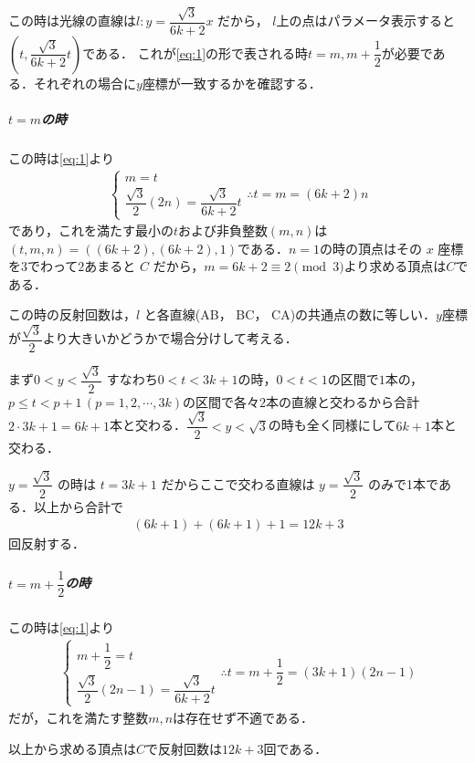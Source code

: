 \documentclass[../../main.tex]{subfiles}
\begin{document}
この時は光線の直線は$l : y = \dfrac{\sqrt{3}}{6k+2}x$ だから，
$l$上の点はパラメータ表示すると$\left(t, \dfrac{\sqrt{3}}{6k+2}t\right)$である．
これが\cref{eq:1}の形で表される時$t=m, m+\dfrac{1}{2}$が必要である．それぞれの場合に$y$座標が一致するかを確認する．

\subparagraph{$t=m$の時}

この時は\cref{eq:1}より
\begin{align}
  \begin{cases}
    m = t \\
    \dfrac{\sqrt{3}}{2}(2n) = \dfrac{\sqrt{3}}{6k+2}t
  \end{cases}
  \therefore
  t = m = (6k+2)n
\end{align}
であり，これを満たす最小の$t$および非負整数$(m,n)$は$(t,m,n)=((6k+2),(6k+2),1)$である．$n=1$の時の頂点はその $x$ 座標を3でわって$2$あまると $C$ だから，$m=6k+2\equiv 2 \pmod 3$より求める頂点は$C$である．


この時の反射回数は，$l$ と各直線(AB， BC， CA)の共通点の数に等しい．$y$座標が$\dfrac{\sqrt{3}}{2}$より大きいかどうかで場合分けして考える．

まず$0 < y < \dfrac{\sqrt{3}}{2}$ すなわち$0<t<3k+1$の時，$0<t<1$の区間で$1$本の，$p\le t < p+1\, (p=1,2,\cdots,3k)$の区間で各々$2$本の直線と交わるから合計$2\cdot 3k+1=6k+1$本と交わる．$\dfrac{\sqrt{3}}{2}<y<\sqrt{3}$の時も全く同様にして$6k+1$本と交わる．

$y = \dfrac{\sqrt{3}}{2}$ の時は $t = 3k+1$ だからここで交わる直線は $y = \dfrac{\sqrt{3}}{2}$ のみで1本である．以上から合計で
\begin{align}
  (6k+1)+(6k+1)+1 = 12k+3
\end{align}
回反射する．

\subparagraph{$t=m+\dfrac{1}{2}$の時}

この時は\cref{eq:1}より
\begin{align}
  \begin{cases}
    m+\dfrac{1}{2} = t \\
    \dfrac{\sqrt{3}}{2}(2n-1) = \dfrac{\sqrt{3}}{6k+2}t
  \end{cases}
  \therefore
  t = m+\dfrac{1}{2} = (3k+1)(2n-1)
\end{align}
だが，これを満たす整数$m,n$は存在せず不適である．
\casesend

以上から求める頂点は$C$で反射回数は$12k+3$回である．
\end{document}
